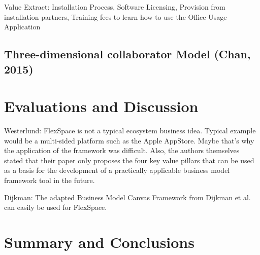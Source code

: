 		Value Extract: Installation Process, Software Licensing, Provision from installation partners, Training fees to learn how to use the Office Usage Application

	\subsection{Three-dimensional collaborator Model (Chan, 2015)}

		

\section{Evaluations and Discussion}
\label{sec:eval}

	Westerlund: FlexSpace is not a typical ecosystem business idea. Typical example would be a multi-sided platform such as the Apple AppStore. Maybe that's why the application of the framework was difficult. Also, the authors themselves stated that their paper only proposes the four key value pillars that can be used as a basis for the development of a practically applicable business model framework tool in the future.

	Dijkman: The adapted Business Model Canvas Framework from Dijkman et al. can easily be used for FlexSpace. 

\section{Summary and Conclusions}
\label{sec:summary}
	
